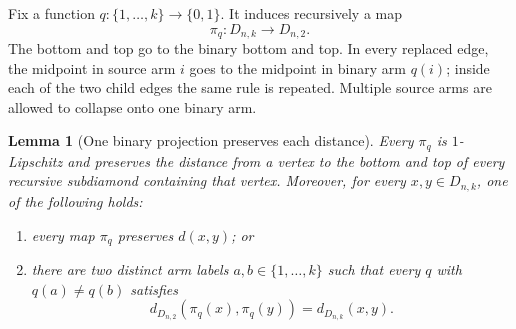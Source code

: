 \documentclass[11pt]{article}
\newtheorem{lemma}[theorem]{Lemma}
\begin{document}
Fix a function $q:\{1,\ldots,k\}\to\{0,1\}$.  It induces recursively a map
\[
                    \pi_q:D_{n,k}\longrightarrow D_{n,2}.
\]
The bottom and top go to the binary bottom and top.  In every replaced edge,
the midpoint in source arm $i$ goes to the midpoint in binary arm $q(i)$;
inside each of the two child edges the same rule is repeated.  Multiple
source arms are allowed to collapse onto one binary arm.

\begin{lemma}[One binary projection preserves each distance]
\label{lem:projection}
Every $\pi_q$ is $1$-Lipschitz and preserves the distance from a vertex to
the bottom and top of every recursive subdiamond containing that vertex.
Moreover, for every $x,y\in D_{n,k}$, one of the following holds:
\begin{enumerate}
 \item every map $\pi_q$ preserves $d(x,y)$; or
 \item there are two distinct arm labels $a,b\in\{1,\ldots,k\}$ such that
       every $q$ with $q(a)\ne q(b)$ satisfies
       \[
          d_{D_{n,2}}(\pi_q(x),\pi_q(y))=d_{D_{n,k}}(x,y).
       \]
\end{enumerate}
\end{lemma}
\end{document}
